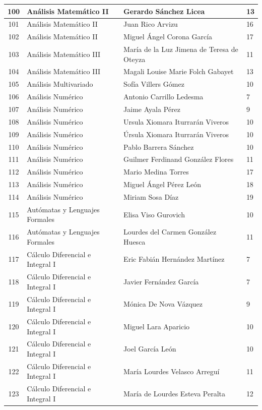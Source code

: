 {\begin{longtable}{|c|p{6.5cm}|p{5cm}|p{1.5cm}|}
100 & Análisis Matemático II & Gerardo Sánchez Licea & 13 \\ \hline
101 & Análisis Matemático II & Juan Rico Arvizu & 16 \\ \hline
102 & Análisis Matemático II & Miguel Ángel Corona García & 17 \\ \hline
103 & Análisis Matemático III & María de la Luz Jimena de Teresa de Oteyza & 11 \\ \hline
104 & Análisis Matemático III & Magali Louise Marie Folch Gabayet & 13 \\ \hline
105 & Análisis Multivariado & Sofía Villers Gómez & 10 \\ \hline
106 & Análisis Numérico & Antonio Carrillo Ledesma & 7 \\ \hline
107 & Análisis Numérico & Jaime Ayala Pérez & 9 \\ \hline
108 & Análisis Numérico & Ursula Xiomara Iturrarán Viveros & 10 \\ \hline
109 & Análisis Numérico & Úrsula Xiomara Iturrarán Viveros & 10 \\ \hline
110 & Análisis Numérico & Pablo Barrera Sánchez & 10 \\ \hline
111 & Análisis Numérico & Guilmer Ferdinand González Flores & 11 \\ \hline
112 & Análisis Numérico & Mario Medina Torres & 17 \\ \hline
113 & Análisis Numérico & Miguel Ángel Pérez León & 18 \\ \hline
114 & Análisis Numérico & Miriam Sosa Díaz & 19 \\ \hline
115 & Autómatas y Lenguajes Formales & Elisa Viso Gurovich & 10 \\ \hline
116 & Autómatas y Lenguajes Formales & Lourdes del Carmen González Huesca & 11 \\ \hline
117 & Cálculo Diferencial e Integral I & Eric Fabián Hernández Martínez & 7 \\ \hline
118 & Cálculo Diferencial e Integral I & Javier Fernández García & 7 \\ \hline
119 & Cálculo Diferencial e Integral I & Mónica De Nova Vázquez & 9 \\ \hline
120 & Cálculo Diferencial e Integral I & Miguel Lara Aparicio & 10 \\ \hline
121 & Cálculo Diferencial e Integral I & Joel García León & 10 \\ \hline
122 & Cálculo Diferencial e Integral I & María Lourdes Velasco Arreguí & 11 \\ \hline
123 & Cálculo Diferencial e Integral I & María de Lourdes Esteva Peralta & 12 \\ \hline

\end{longtable}}
